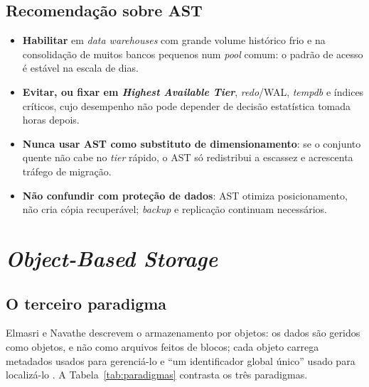 \documentclass[11pt,a4paper]{article}
\begin{document}
\subsection{Recomendação sobre AST}
\label{sec:astrec}

\begin{itemize}[leftmargin=0.7cm,itemsep=1pt]
\item \textbf{Habilitar} em \textit{data warehouses} com grande volume histórico frio e na consolidação de
muitos bancos pequenos num \textit{pool} comum: o padrão de acesso é estável na escala de dias.
\item \textbf{Evitar, ou fixar em \textit{Highest Available Tier}}, \textit{redo}/WAL, \textit{tempdb} e
índices críticos, cujo desempenho não pode depender de decisão estatística tomada horas depois.
\item \textbf{Nunca usar AST como substituto de dimensionamento}: se o conjunto quente não cabe no
\textit{tier} rápido, o AST só redistribui a escassez e acrescenta tráfego de migração.
\item \textbf{Não confundir com proteção de dados}: AST otimiza posicionamento, não cria cópia
recuperável; \textit{backup} e replicação continuam necessários.
\end{itemize}

\section{\textit{Object-Based Storage}}
\label{sec:objeto}

\subsection{O terceiro paradigma}

Elmasri e Navathe descrevem o armazenamento por objetos: os dados são geridos como objetos, e não como
arquivos feitos de blocos; cada objeto carrega metadados usados para gerenciá-lo e ``um identificador
global único'' usado para localizá-lo \cite{elmasri2018}. A Tabela~\ref{tab:paradigmas} contrasta os três
paradigmas.
\end{document}
